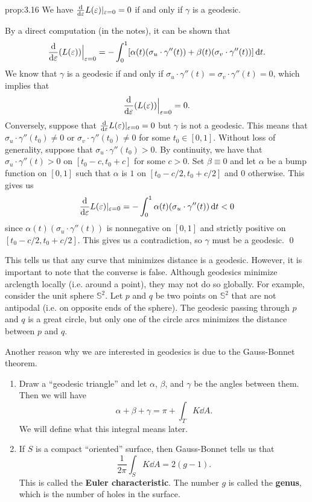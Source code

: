 \begin{prop}{prop:3.16}
    We have $\frac{\rm d}{{\rm d}\varepsilon} L(\varepsilon)|_{\varepsilon=0} = 0$ if and only 
    if $\gamma$ is a geodesic. 
\end{prop}\vspace{-0.25cm} 
\begin{pf}
    By a direct computation (in the notes), it can be shown that 
    \[ \frac{\rm d}{{\rm d}\varepsilon} (L(\varepsilon)) \Big|_{\varepsilon=0} 
    = -\int_0^1 [\alpha(t) (\sigma_u \cdot \gamma''(t)) + 
    \beta(t) (\sigma_v \cdot \gamma''(t))]\,\mathrm{d} t. \] 
    We know that $\gamma$ is a geodesic if and only if 
    $\sigma_u \cdot \gamma''(t) = \sigma_v \cdot \gamma''(t) = 0$, 
    which implies that 
    \[ \frac{\rm d}{{\rm d}\varepsilon} (L(\varepsilon)) \Big|_{\varepsilon=0} = 0. \] 
    Conversely, suppose that $\frac{\rm d}{{\rm d}\varepsilon} L(\varepsilon)|_{\varepsilon=0} = 0$
    but $\gamma$ is not a geodesic. This means that 
    $\sigma_u \cdot \gamma''(t_0) \neq 0$ or $\sigma_v \cdot \gamma''(t_0) \neq 0$ 
    for some $t_0 \in [0, 1]$. Without loss of generality, 
    suppose that $\sigma_u \cdot \gamma''(t_0) > 0$. 
    By continuity, we have that $\sigma_u \cdot \gamma''(t) > 0$ 
    on $[t_0 - c, t_0 + c]$ for some $c > 0$. Set $\beta \equiv 0$ 
    and let $\alpha$ be a bump function on $[0, 1]$ such that 
    $\alpha$ is $1$ on $[t_0 - c/2, t_0 + c/2]$ and $0$ otherwise. This 
    gives us 
    \[ \frac{\rm d}{{\rm d}\varepsilon} L(\varepsilon)|_{\varepsilon=0} = -\int_0^1 
    \alpha(t) (\sigma_u \cdot \gamma''(t))\,\mathrm{d} t < 0 \] 
    since $\alpha(t) (\sigma_u \cdot \gamma''(t))$ is nonnegative 
    on $[0, 1]$ and strictly positive on $[t_0 - c/2, t_0 + c/2]$. 
    This gives us a contradiction, so $\gamma$ must be a geodesic. \qed 
\end{pf}\vspace{-0.25cm}

This tells us that any curve that minimizes distance is a geodesic. 
However, it is important to note that the converse is false. Although 
geodesics minimize arclength locally (i.e. around a point), they 
may not do so globally. 
For example, consider the unit sphere $\mathbb{S}^2$. Let $p$ and 
$q$ be two points on $\mathbb{S}^2$ that are not antipodal (i.e. 
on opposite ends of the sphere). The geodesic passing through 
$p$ and $q$ is a great circle, but only one of the circle arcs 
minimizes the distance between $p$ and $q$. 

Another reason why we are interested in geodesics is due to the Gauss-Bonnet 
theorem.
\begin{enumerate}[(1)]
    \item Draw a ``geodesic triangle'' and let $\alpha$, $\beta$, and $\gamma$ 
    be the angles between them. Then we will have 
    \[ \alpha + \beta + \gamma = \pi + \int_T K\dd A. \] 
    We will define what this integral means later. 

    \item If $S$ is a compact ``oriented'' surface, then Gauss-Bonnet 
    tells us that 
    \[ \frac{1}{2\pi} \int_S K\dd A = 2(g-1). \] 
    This is called the {\bf Euler characteristic}. The
    number $g$ is called the {\bf genus}, which is the number of 
    holes in the surface. 
\end{enumerate}